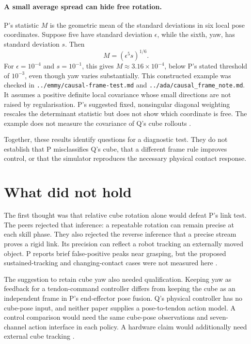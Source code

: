 \documentclass{article}
\begin{document}
\paragraph{A small average spread can hide free rotation.}
P's statistic \(M\) is the geometric mean of the standard deviations in six local pose coordinates.
Suppose five have standard deviation \(\epsilon\), while the sixth, yaw, has standard deviation \(s\).
Then
\[
M=(\epsilon^5s)^{1/6}.
\]
For \(\epsilon=10^{-4}\) and \(s=10^{-1}\), this gives \(M\approx3.16\times10^{-4}\), below P's stated
threshold of \(10^{-3}\), even though yaw varies substantially. This constructed example was checked in
\texttt{../emmy/causal-frame-test.md} and \texttt{../ada/causal\_frame\_note.md}. It assumes a positive
definite local covariance whose small directions are not raised by regularisation. P's suggested fixed,
nonsingular diagonal weighting rescales the determinant statistic but does not show which coordinate is
free. The example does not measure the covariance of Q's cube rollouts \cite{P,Q}.

Together, these results identify questions for a diagnostic test. They do not establish that P
misclassifies Q's cube, that a different frame rule improves control, or that the simulator reproduces
the necessary physical contact response.

\section{What did not hold}

The first thought was that relative cube rotation alone would defeat P's link test. The peers rejected
that inference: a repeatable rotation can remain precise at each skill phase. They also rejected the
reverse inference that a precise stream proves a rigid link. Its precision can reflect a robot tracking
an externally moved object. P reports brief false-positive peaks near grasping, but the proposed
sustained-tracking and changing-contact cases were not measured here \cite{P}.

The suggestion to retain cube yaw also needed qualification. Keeping yaw as feedback for a tendon-command
controller differs from keeping the cube as an independent frame in P's end-effector pose fusion. Q's
physical controller has no cube-pose input, and neither paper supplies a pose-to-tendon action model. A
control comparison would need the same cube-pose observations and seven-channel action interface in each
policy. A hardware claim would additionally need external cube tracking \cite{Q,P}.
\end{document}
